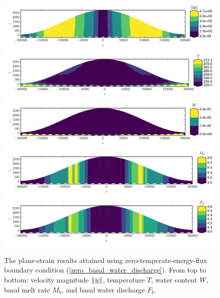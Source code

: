\begin{figure}
  \centering

    \includegraphics[width=\linewidth]{images/tmc/plane_strain/zero_energy/U_mag.pdf}
    \includegraphics[width=\linewidth]{images/tmc/plane_strain/zero_energy/T.pdf}
    \includegraphics[width=\linewidth]{images/tmc/plane_strain/zero_energy/W.pdf}
    \includegraphics[width=\linewidth]{images/tmc/plane_strain/zero_energy/Mb.pdf}
    \includegraphics[width=\linewidth]{images/tmc/plane_strain/zero_energy/Fb.pdf}

  \caption[Plane-strain zero-energy-flux solution]{The plane-strain results attained using zero-temperate-energy-flux boundary condition (\ref{zero_basal_water_discharge}).  From top to bottom: velocity magnitude $\Vert \underline{u} \Vert$, temperature $T$, water content $W$, basal melt rate $M_b$, and basal water discharge $F_b$.}
  \label{tmc_zero_energy_image}
\end{figure}

